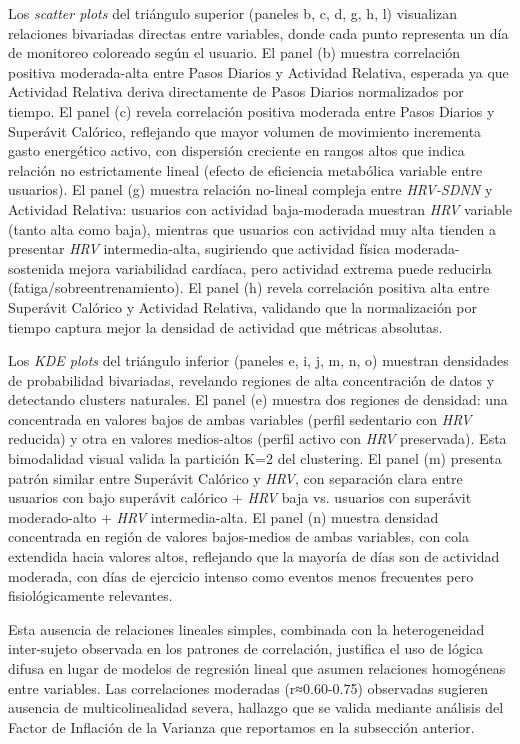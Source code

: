 Los \textit{scatter plots} del triángulo superior (paneles b, c, d, g, h, l) visualizan relaciones bivariadas directas entre variables, donde cada punto representa un día de monitoreo coloreado según el usuario. El panel (b) muestra correlación positiva moderada-alta entre Pasos Diarios y Actividad Relativa, esperada ya que Actividad Relativa deriva directamente de Pasos Diarios normalizados por tiempo. El panel (c) revela correlación positiva moderada entre Pasos Diarios y Superávit Calórico, reflejando que mayor volumen de movimiento incrementa gasto energético activo, con dispersión creciente en rangos altos que indica relación no estrictamente lineal (efecto de eficiencia metabólica variable entre usuarios). El panel (g) muestra relación no-lineal compleja entre \textit{HRV-SDNN} y Actividad Relativa: usuarios con actividad baja-moderada muestran \textit{HRV} variable (tanto alta como baja), mientras que usuarios con actividad muy alta tienden a presentar \textit{HRV} intermedia-alta, sugiriendo que actividad física moderada-sostenida mejora variabilidad cardíaca, pero actividad extrema puede reducirla (fatiga/sobreentrenamiento). El panel (h) revela correlación positiva alta entre Superávit Calórico y Actividad Relativa, validando que la normalización por tiempo captura mejor la densidad de actividad que métricas absolutas.

Los \textit{KDE plots} del triángulo inferior (paneles e, i, j, m, n, o) muestran densidades de probabilidad bivariadas, revelando regiones de alta concentración de datos y detectando clusters naturales. El panel (e) muestra dos regiones de densidad: una concentrada en valores bajos de ambas variables (perfil sedentario con \textit{HRV} reducida) y otra en valores medios-altos (perfil activo con \textit{HRV} preservada). Esta bimodalidad visual valida la partición K=2 del clustering. El panel (m) presenta patrón similar entre Superávit Calórico y \textit{HRV}, con separación clara entre usuarios con bajo superávit calórico + \textit{HRV} baja vs. usuarios con superávit moderado-alto + \textit{HRV} intermedia-alta. El panel (n) muestra densidad concentrada en región de valores bajos-medios de ambas variables, con cola extendida hacia valores altos, reflejando que la mayoría de días son de actividad moderada, con días de ejercicio intenso como eventos menos frecuentes pero fisiológicamente relevantes.

Esta ausencia de relaciones lineales simples, combinada con la heterogeneidad inter-sujeto observada en los patrones de correlación, justifica el uso de lógica difusa en lugar de modelos de regresión lineal que asumen relaciones homogéneas entre variables. Las correlaciones moderadas (r≈0.60-0.75) observadas sugieren ausencia de multicolinealidad severa, hallazgo que se valida mediante análisis del Factor de Inflación de la Varianza que reportamos en la subsección anterior.

